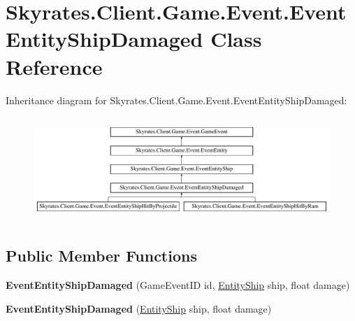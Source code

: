 \hypertarget{class_skyrates_1_1_client_1_1_game_1_1_event_1_1_event_entity_ship_damaged}{\section{Skyrates.\-Client.\-Game.\-Event.\-Event\-Entity\-Ship\-Damaged Class Reference}
\label{class_skyrates_1_1_client_1_1_game_1_1_event_1_1_event_entity_ship_damaged}
}
Inheritance diagram for Skyrates.\-Client.\-Game.\-Event.\-Event\-Entity\-Ship\-Damaged\-:\begin{figure}[H]
\begin{center}
\leavevmode
\includegraphics[height=3.977273cm]{class_skyrates_1_1_client_1_1_game_1_1_event_1_1_event_entity_ship_damaged}
\end{center}
\end{figure}
\subsection*{Public Member Functions}
\begin{DoxyCompactItemize}
\item 
\hypertarget{class_skyrates_1_1_client_1_1_game_1_1_event_1_1_event_entity_ship_damaged_a86df9e1c60a43a4ff57fdb8480ad4507}{{\bfseries Event\-Entity\-Ship\-Damaged} (Game\-Event\-I\-D id, \hyperlink{class_skyrates_1_1_common_1_1_entity_1_1_entity_ship}{Entity\-Ship} ship, float damage)}\label{class_skyrates_1_1_client_1_1_game_1_1_event_1_1_event_entity_ship_damaged_a86df9e1c60a43a4ff57fdb8480ad4507}

\item 
\hypertarget{class_skyrates_1_1_client_1_1_game_1_1_event_1_1_event_entity_ship_damaged_a2a048eb51301e53afe2dcfc8079099a6}{{\bfseries Event\-Entity\-Ship\-Damaged} (\hyperlink{class_skyrates_1_1_common_1_1_entity_1_1_entity_ship}{Entity\-Ship} ship, float damage)}\label{class_skyrates_1_1_client_1_1_game_1_1_event_1_1_event_entity_ship_damaged_a2a048eb51301e53afe2dcfc8079099a6}

\end{DoxyCompactItemize}

